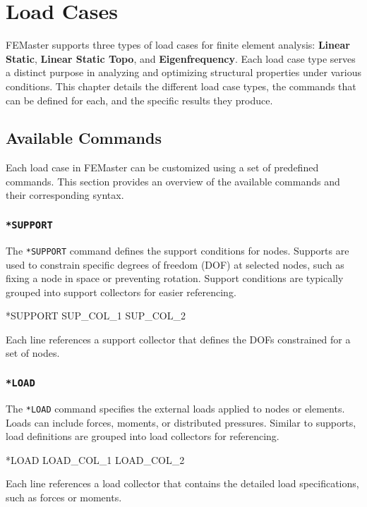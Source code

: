 \chapter{Load Cases}
\label{chap:loadcases}

FEMaster supports three types of load cases for finite element analysis: \textbf{Linear Static}, \textbf{Linear Static Topo}, and \textbf{Eigenfrequency}. Each load case type serves a distinct purpose in analyzing and optimizing structural properties under various conditions. This chapter details the different load case types, the commands that can be defined for each, and the specific results they produce.

\section{Available Commands}
Each load case in FEMaster can be customized using a set of predefined commands. This section provides an overview of the available commands and their corresponding syntax.

\subsection{\texttt{*SUPPORT}}
The \texttt{*SUPPORT} command defines the support conditions for nodes. Supports are used to constrain specific degrees of freedom (DOF) at selected nodes, such as fixing a node in space or preventing rotation. Support conditions are typically grouped into support collectors for easier referencing.

\begin{codeBlock}
*SUPPORT
SUP_COL_1
SUP_COL_2
\end{codeBlock}

Each line references a support collector that defines the DOFs constrained for a set of nodes.

\subsection{\texttt{*LOAD}}
The \texttt{*LOAD} command specifies the external loads applied to nodes or elements. Loads can include forces, moments, or distributed pressures. Similar to supports, load definitions are grouped into load collectors for referencing.

\begin{codeBlock}
*LOAD
LOAD_COL_1
LOAD_COL_2
\end{codeBlock}

Each line references a load collector that contains the detailed load specifications, such as forces or moments.

